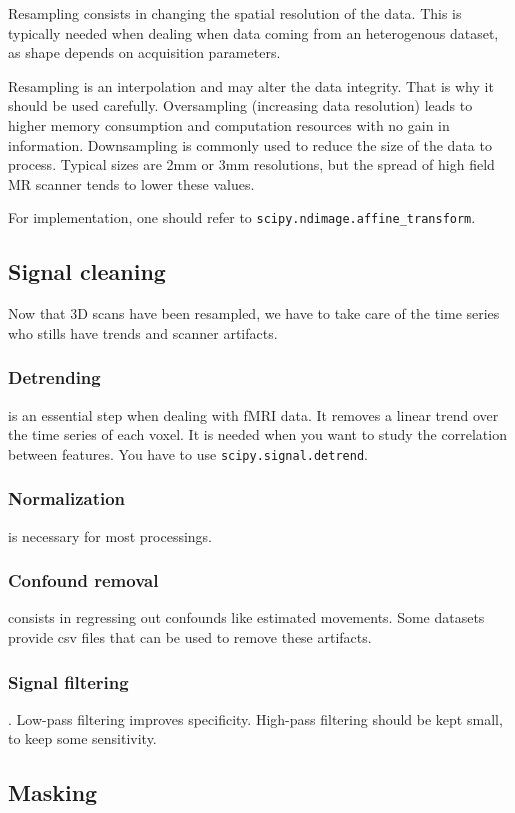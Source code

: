 \documentclass{frontiersSCNS} %
\begin{document}
Resampling consists in changing the spatial resolution of the data. This is
typically needed
when dealing when data coming from an heterogenous dataset, as shape depends
on acquisition parameters.

Resampling is an interpolation and may alter the data integrity. That is
why it should be used carefully. Oversampling (increasing
data resolution) leads to higher memory consumption and computation resources
with no gain in information.
Downsampling is commonly used to reduce the size of the data to process.
Typical sizes are 2mm or 3mm resolutions, but the spread of high field MR
scanner tends to lower these values.

For implementation, one should refer to \texttt{scipy.ndimage.affine\_transform}.

\subsection{Signal cleaning}

Now that 3D scans have been resampled, we have to take care of the time series
who stills have trends and scanner artifacts.

\subsubsection{Detrending} is an essential step when dealing with fMRI data. It removes a
linear trend over the time series of each
voxel. It is needed when you want to study the correlation between
features. You have to use \texttt{scipy.signal.detrend}.
\subsubsection{Normalization} is necessary for most processings.
\subsubsection{Confound removal} consists in regressing out confounds like
estimated movements. Some datasets provide csv files that can be used to remove
these artifacts.
\subsubsection{Signal filtering}. Low-pass filtering improves specificity.
High-pass filtering should be kept small, to keep some sensitivity.

\subsection{Masking}
\end{document}
